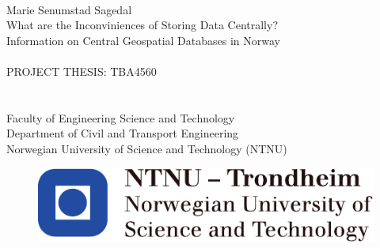 \thispagestyle{empty}
\mbox{}\\[6pc]

\noindent\Large{Marie Senumstad Sagedal}\\[4pc]
\Huge{What are the Inconviniences of Storing Data Centrally?}\\[1pc]
\Large{Information on Central Geospatial Databases in Norway}\\[5pc]
\\[2pc]
PROJECT THESIS: TBA4560\\
\large{ }\\%
\large{ }\\[2pc]%
Faculty of Engineering Science and Technology\\
Department of Civil and Transport Engineering\\
Norwegian University of Science and Technology (NTNU)
\begin{figure}[b!]
   \includegraphics[scale=1.0]{img/NTNU}
\end{figure}

\vfill



